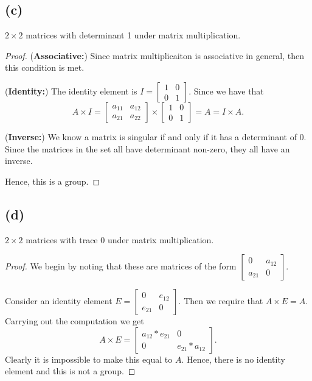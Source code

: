 \documentclass{article}
\begin{document}
\subsection*{(c)}
$2\times 2$ matrices with determinant 1 under matrix multiplication.

\begin{proof}
    (\textbf{Associative:}) Since matrix multiplicaiton is associative in general, then this
    condition is met.

    (\textbf{Identity:}) The identity element is $I = \begin{bmatrix}
            1 & 0 \\
            0 & 1
        \end{bmatrix}.$ Since we have that
    \begin{equation}
        A\times I = \begin{bmatrix}
            a_{11} & a_{12} \\
            a_{21} & a_{22}
        \end{bmatrix} \times \begin{bmatrix}
            1 & 0 \\
            0 & 1
        \end{bmatrix} = A = I\times A.
    \end{equation}

    (\textbf{Inverse:}) We know a matrix is singular if and only if it has a determinant of 0.
    Since the matrices in the set all have determinant non-zero, they all have an inverse.

    Hence, this is a group.
\end{proof}

\subsection*{(d)}
$2\times 2$ matrices with trace 0 under matrix multiplication.

\begin{proof}
    We begin by noting that these are matrices of the form $\begin{bmatrix}
            0      & a_{12} \\
            a_{21} & 0
        \end{bmatrix}$.

    Consider an identity element $E = \begin{bmatrix}
            0      & e_{12} \\
            e_{21} & 0
        \end{bmatrix}$. Then we require that $A \times E = A$. Carrying out the computation we get
    \begin{equation*}
        A \times E  = \begin{bmatrix}
            a_{12}*e_{21} & 0             \\
            0             & e_{21}*a_{12}
        \end{bmatrix}.
    \end{equation*}
    Clearly it is impossible to make this equal to $A$. Hence, there is no identity element and this is not
    a group.
\end{proof}
\end{document}
